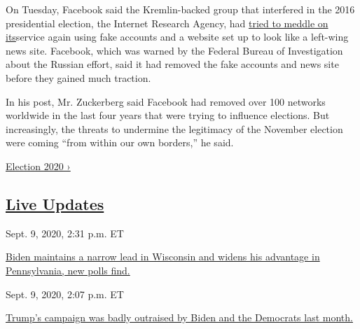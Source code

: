 On Tuesday, Facebook said the Kremlin-backed group that interfered in
the 2016 presidential election, the Internet Research Agency, had
\href{https://www.nytimes3xbfgragh.onion/2020/09/01/technology/facebook-russia-disinformation-election.html}{tried
to meddle on its}service again using fake accounts and a website set up
to look like a left-wing news site. Facebook, which was warned by the
Federal Bureau of Investigation about the Russian effort, said it had
removed the fake accounts and news site before they gained much
traction.

In his post, Mr. Zuckerberg said Facebook had removed over 100 networks
worldwide in the last four years that were trying to influence
elections. But increasingly, the threats to undermine the legitimacy of
the November election were coming ``from within our own borders,'' he
said.

\href{https://www.nytimes3xbfgragh.onion/news-event/2020-election}{Election
2020 ›}

\hypertarget{live-updates}{%
\subsection{\texorpdfstring{\href{https://www.nytimes3xbfgragh.onion/live/2020/09/09/us/trump-vs-biden}{Live
Updates}}{Live Updates}}\label{live-updates}}

\href{https://www.nytimes3xbfgragh.onion/live/2020/09/09/us/trump-vs-biden\#biden-maintains-a-narrow-lead-in-wisconsin-and-widens-his-advantage-in-pennsylvania-new-polls-find}{}

Sept. 9, 2020, 2:31 p.m. ET

\href{https://www.nytimes3xbfgragh.onion/live/2020/09/09/us/trump-vs-biden\#biden-maintains-a-narrow-lead-in-wisconsin-and-widens-his-advantage-in-pennsylvania-new-polls-find}{Biden
maintains a narrow lead in Wisconsin and widens his advantage in
Pennsylvania, new polls
find.}\href{https://www.nytimes3xbfgragh.onion/live/2020/09/09/us/trump-vs-biden\#trumps-campaign-was-badly-outraised-by-biden-and-the-democrats-last-month}{}

Sept. 9, 2020, 2:07 p.m. ET

\href{https://www.nytimes3xbfgragh.onion/live/2020/09/09/us/trump-vs-biden\#trumps-campaign-was-badly-outraised-by-biden-and-the-democrats-last-month}{Trump's
campaign was badly outraised by Biden and the Democrats last
month.}\href{https://www.nytimes3xbfgragh.onion/live/2020/09/09/us/trump-vs-biden\#a-new-poll-shows-most-voters-think-trump-did-a-bad-job-on-the-virus-and-doubt-he-can-help-the-country-recover}{}

